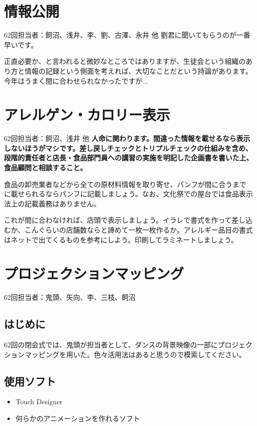 \documentclass[a4paper]{ltjsreport}
\begin{document}
\section{情報公開}
62回担当者：飼沼、浅井、李、劉、古澤、永井 他\vspace{3mm}
劉君に聞いてもらうのが一番早いです。

正直必要か、と言われると微妙なところではありますが、生徒会という組織のあり方と情報の記録という側面を考えれば、大切なことだという持論があります。今年はうまく間に合わせられなかったですが...

\section{アレルゲン・カロリー表示}\label{sec:アレルゲン・カロリー表示}
62回担当者：飼沼、浅井 他\vspace{3mm}
\textbf{人命に関わります。間違った情報を載せるなら表示しないほうがマシです。差し戻しチェックとトリプルチェックの仕組みを含め、段階的責任者と店長・食品部門員への講習の実施を明記した企画書を書いた上、食品顧問と相談すること。}

食品の卸売業者などから全ての原材料情報を取り寄せ、パンフが間に合うまでに載せられるならパンフに記載しましょう。なお、文化祭での屋台では食品表示法上の記載義務はありません。

これが間に合わなければ、店頭で表示しましょう。イラレで書式を作って差し込むか、こんぐらいの店舗数ならと諦めて一枚一枚作るか。アレルギー品目の書式はネットで出てくるものを参考にしよう。印刷してラミネートしましょう。

\section{プロジェクションマッピング}
62回担当者：鬼頭、矢向、李、三枝、飼沼
\subsection{はじめに}
62回の閉会式では、鬼頭が担当者として、ダンスの背景映像の一部にプロジェクションマッピングを用いた。色々活用法はあると思うので模索してください。

\subsection{使用ソフト}
\begin{itemize}
  \item Touch Designer
  \item 何らかのアニメーションを作れるソフト
\end{itemize}
\end{document}

